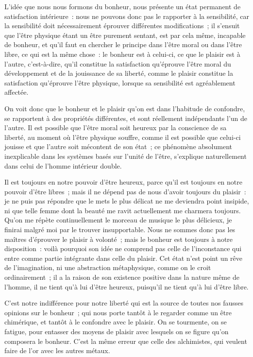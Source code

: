 \documentclass[french,twoside]{book} %
\newcommand\chaptercont{} %
\begin{document}
\chaptercont
\noindent L’idée que nous nous formons du bonheur, nous présente un état permanent de satisfaction intérieure : nous ne pouvons donc pas le rapporter à la sensibilité, car la sensibilité doit nécessairement éprouver différentes modifications ; il s’ensuit que l’être physique étant un être purement sentant, est par cela même, incapable de bonheur, et qu’il faut en chercher le principe dans l’être moral ou dans l’être libre, ce qui est la même chose : le bonheur est à celui-ci, ce que le plaisir est à l’autre, c’est-à-dire, qu’il constitue la satisfaction qu’éprouve l’être moral du développement et de la jouissance de sa liberté, comme le plaisir constitue la satisfaction qu’éprouve l’être physique, lorsque sa sensibilité est agréablement affectée.\par
On voit donc que le bonheur et le plaisir qu’on est dans l’habitude de confondre, se rapportent à des propriétés différentes, et sont réellement indépendants l’un de l’autre. Il est possible que l’être moral soit heureux par la conscience de sa liberté, au moment où l’être physique souffre, comme il est possible que celui-ci jouisse et que l’autre soit mécontent de son état ; ce phénomène absolument inexplicable dans les systèmes basés sur l’unité de l’être, s’explique naturellement dans celui de l’homme intérieur double.\par
Il est toujours en notre pouvoir d’être heureux, parce qu’il est toujours en notre pouvoir d’être libres ; mais il ne dépend pas de nous d’avoir toujours du plaisir : je ne puis pas répondre que le mets le plus délicat ne me deviendra point insipide, ni que telle femme dont la beauté me ravit actuellement me charmera toujours. Qu’on me répète continuellement le morceau de musique le plus délicieux, je finirai malgré moi par le trouver insupportable. Nous ne sommes donc pas les maîtres d’éprouver le plaisir à volonté ; mais le bonheur est toujours à notre disposition : voilà pourquoi son idée ne comprend pas celle de l’inconstance qui entre comme partie intégrante dans celle du plaisir. Cet état n’est point un rêve de l’imagination, ni une abstraction métaphysique, comme on le croit ordinairement ; il a la raison de son existence positive dans la nature même de l’homme, il ne tient qu’à lui d’être heureux, puisqu’il ne tient qu’à lui d’être libre.\par
C’est notre indifférence pour notre liberté qui est la source de toutes nos fausses opinions sur le bonheur ; qui nous porte tantôt à le regarder comme un être chimérique, et tantôt à le confondre avec le plaisir. On se tourmente, on se fatigue, pour entasser des moyens de plaisir avec lesquels on se figure qu’on composera le bonheur. C’est la même erreur que celle des alchimistes, qui veulent faire de l’or avec les autres métaux.\par
\end{document}
